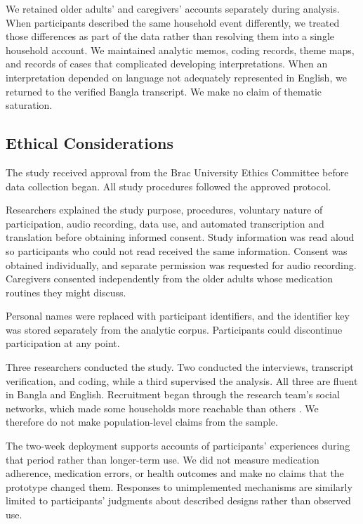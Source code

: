 We retained older adults' and caregivers' accounts separately during analysis. When participants described the same household event differently, we treated those differences as part of the data rather than resolving them into a single household account. We maintained analytic memos, coding records, theme maps, and records of cases that complicated developing interpretations. When an interpretation depended on language not adequately represented in English, we returned to the verified Bangla transcript. We make no claim of thematic saturation.

\subsection{Ethical Considerations}

The study received approval from the Brac University Ethics Committee before data collection began. All study procedures followed the approved protocol.

Researchers explained the study purpose, procedures, voluntary nature of participation, audio recording, data use, and automated transcription and translation before obtaining informed consent. Study information was read aloud so participants who could not read received the same information. Consent was obtained individually, and separate permission was requested for audio recording. Caregivers consented independently from the older adults whose medication routines they might discuss.

Personal names were replaced with participant identifiers, and the identifier key was stored separately from the analytic corpus. Participants could discontinue participation at any point.

Three researchers conducted the study. Two conducted the interviews, transcript verification, and coding, while a third supervised the analysis. All three are fluent in Bangla and English. Recruitment began through the research team's social networks, which made some households more reachable than others \cite{75,103}. We therefore do not make population-level claims from the sample.

The two-week deployment supports accounts of participants' experiences during that period rather than longer-term use. We did not measure medication adherence, medication errors, or health outcomes and make no claims that the prototype changed them. Responses to unimplemented mechanisms are similarly limited to participants' judgments about described designs rather than observed use.
